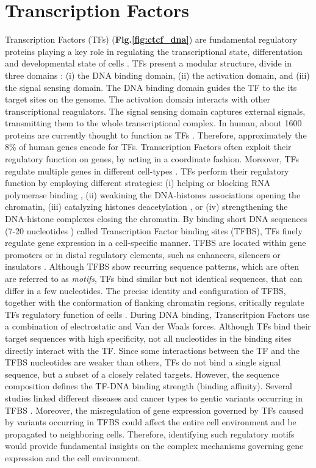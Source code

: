 \documentclass[a4paper, titlepage, openright]{book}
\newcommand{\mychapter}[2]{
    \setcounter{chapter}{#1}
    \setcounter{section}{0}
    \chapter*{#2}
    \addcontentsline{toc}{chapter}{#2}
}
\begin{document}
\mychapter{2}{Transcription Factors}
Transcription Factors (TFs) (\textbf{Fig.\ref{fig:ctcf_dna}}) are fundamental regulatory proteins playing a key role in regulating the transcriptional state, differentation and developmental state of cells \citep{lambert2018human, reimold2001plasma, whyte2013master}. TFs present a modular structure, divide in three domains \citep{latchman1997transcription}: (i) the DNA binding domain, (ii) the activation domain, and (iii) the signal sensing domain. The DNA binding domain guides the TF to the its target sites on the genome. The activation domain interacts with other transcriptional reagulators. The signal sensing domain captures external signals, transmitting them to the whole transcriptional complex. In human, about 1600 proteins are currently thought to function as TFs \citep{babu2004structure}. Therefore, approximately the $8$\% of human genes encode for TFs. Transcription Factors often exploit their regulatory function on genes, by acting in a coordinate fashion. Moreover, TFs regulate multiple genes in different cell-types \citep{lambert2018human}. TFs perform their regulatory function by employing different strategies: (i) helping or blocking RNA polymerase binding \citep{fuda2009defining}, (ii) weakining the DNA-histones associations opening the chromatin, (iii) catalyzing histones deacetylation \citep{liu2016beyond}, or (iv) strengthening the DNA-histone complexes closing the chromatin. By binding short DNA sequences (7-20 nucleotides \citep{stewart2012transcription}) called Transcription Factor binding sites (TFBS), TFs finely regulate gene expression in a cell-specific manner. TFBS are located within gene promoters \citep{whitfield2012functional} or in distal regulatory elements, such as enhancers, silencers or insulators \citep{gotea2010homotypic,lemon2000orchestrated,nolis2009transcription}. Although TFBS show recurring sequence patterns, which are often are referred to as \emph{motifs}, TFs bind similar but not identical sequences, that can differ in a few nucleotides. The precise identity and configuration of TFBS, together with the conformation of flanking chromatin regions, critically regulate TFs regulatory function of cells \citep{mendenhall2013locus,maurano2015large}. During DNA binding, Transcritpion Factors use a combination of electrostatic and Van der Waals forces. Although TFs bind their target sequences with high specificity, not all nucleotides in the binding sites directly interact with the TF. Since some interactions between the TF and the TFBS nucleotides are weaker than others, TFs do not bind a single signal sequence, but a subset of a closely related targets. However, the sequence composition defines the TF-DNA binding strength (binding affinity). Several studies linked different diseases and cancer types to gentic variants occurring in TFBS \citep{docquier2005heightened, katainen2015ctcf, yu2019gata1}. Moreover, the misregulation of gene expression governed by TFs caused by variants occurring in TFBS could affect the entire cell environment and be propagated to neighboring cells. Therefore, identifying such regulatory motifs would provide fundamental insights on the complex mechanisms governing gene expression and the cell environment.
\end{document}
